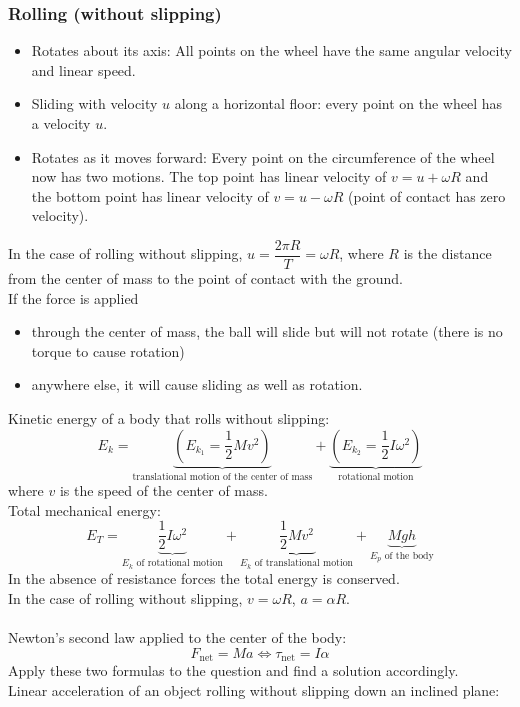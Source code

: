 \documentclass[a4paper,12pt]{article}
\begin{document}
\subsubsection*{Rolling (without slipping)}
\begin{itemize}
  \item Rotates about its axis: All points on the wheel have the same angular velocity and linear speed.
  \item Sliding with velocity $u$ along a horizontal floor: every point on the wheel has a velocity $u$.
  \item Rotates as it moves forward: Every point on the circumference of the wheel now has two motions. The top point has linear velocity of $v=u+\omega R$ and the bottom point has linear velocity of $v=u-\omega R$ (point of contact has zero velocity).
\end{itemize}
In the case of rolling without slipping, $u=\dfrac{2\pi R}{T}=\omega R$, where $R$ is the distance from the center of mass to the point of contact with the ground.
\\If the force is applied
\begin{itemize}
  \item through the center of mass, the ball will slide but will not rotate (there is no torque to cause rotation)
  \item anywhere else, it will cause sliding as well as rotation.
\end{itemize}
Kinetic energy of a body that rolls without slipping:
\[E_k=\underbrace{\left(E_{k_1}=\dfrac{1}{2}Mv^2\right)}_\text{translational motion of the center of mass}+\underbrace{\left(E_{k_2}=\dfrac{1}{2}I\omega^2\right)}_\text{rotational motion}\]
where $v$ is the speed of the center of mass.\\
Total mechanical energy:
\[E_T=\underbrace{\dfrac{1}{2}I\omega^2}_\text{$E_k$ of rotational motion}+\underbrace{\dfrac{1}{2}Mv^2}_\text{$E_k$ of translational motion}+\underbrace{Mgh}_\text{$E_p$ of the body}\]
In the absence of resistance forces the total energy is conserved.\\
In the case of rolling without slipping, $v=\omega R$, $a=\alpha R$.\\\\
Newton's second law applied to the center of the body:
\[F_\text{net}=Ma\Leftrightarrow\tau_\text{net}=I\alpha\]
Apply these two formulas to the question and find a solution accordingly.\\
Linear acceleration of an object rolling without slipping down an inclined plane:
\end{document}

